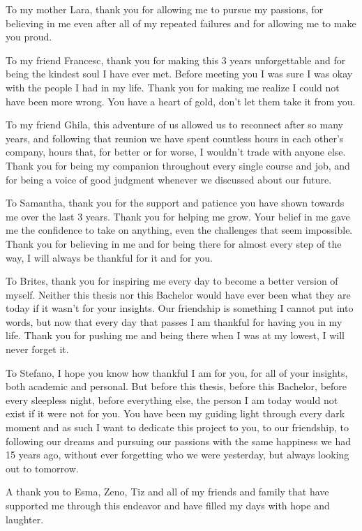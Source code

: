 \documentclass[a4paper]{usiinfbachelorproject}
\begin{document}
To my mother Lara, thank you for allowing me to pursue my passions, for believing in me even after all of my repeated failures and for allowing me to make you proud.

To my friend Francesc, thank you for making this 3 years unforgettable and for being the kindest soul I have ever met. Before meeting you I was sure I was okay with the people I had in my life. Thank you for making me realize I could not have been more wrong. You have a heart of gold, don't let them take it from you.

To my friend Ghila, this adventure of us allowed us to reconnect after so many years, and following that reunion we have spent countless hours in each other's company, hours that, for better or for worse, I wouldn't trade with anyone else. Thank you for being my companion throughout every single course and job, and for being a voice of good judgment whenever we discussed about our future.

To Samantha, thank you for the support and patience you have shown towards me over the last 3 years. Thank you for helping me grow. Your belief in me gave me the confidence to take on anything, even the challenges that seem impossible. Thank you for believing in me and for being there for almost every step of the way, I will always be thankful for it and for you.

To Brites, thank you for inspiring me every day to become a better version of myself. Neither this thesis nor this Bachelor would have ever been what they are today if it wasn't for your insights. Our friendship is something I cannot put into words, but now that every day that passes I am thankful for having you in my life. Thank you for pushing me and being there when I was at my lowest, I will never forget it.

To Stefano, I hope you know how thankful I am for you, for all of your insights, both academic and personal. But before this thesis, before this Bachelor, before every sleepless night, before everything else, the person I am today would not exist if it were not for you. You have been my guiding light through every dark moment and as such I want to dedicate this project to you, to our friendship, to following our dreams and pursuing our passions with the same happiness we had 15 years ago, without ever forgetting who we were yesterday, but always looking out to tomorrow.

A thank you to Esma, Zeno, Tiz and all of my friends and family that have supported me through this endeavor and have filled my days with hope and laughter.
\end{document}
